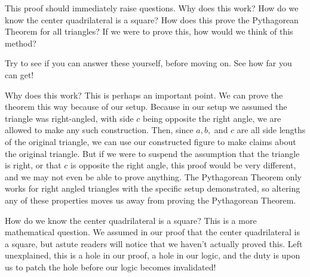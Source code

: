 This proof should immediately raise questions. Why does this work? How do we know the center quadrilateral is a square? How does this prove the Pythagorean Theorem for all triangles? If we were to prove this, how would we think of this method? 
\begin{exercise}
    Try to see if you can answer these yourself, before moving on. See how far you can get! 
\end{exercise}


Why does this work? This is perhaps an important point. We can prove the theorem this way because of our setup. Because in our setup we assumed the triangle was right-angled, with side $c$ being opposite the right angle, we are allowed to make any such construction. Then, since $a, b,$ and $c$ are all side lengths of the original triangle, we can use our constructed figure to make claims about the original triangle. But if we were to suspend the assumption that the triangle is right, or that $c$ is opposite the right angle, this proof would be very different, and we may not even be able to prove anything. The Pythagorean Theorem only works for right angled triangles with the specific setup demonstrated, so altering any of these properties moves us away from proving the Pythagorean Theorem.

How do we know the center quadrilateral is a square? This is a more mathematical question. We assumed in our proof that the center quadrilateral is a square, but astute readers will notice that we haven't actually proved this. Left unexplained, this is a hole in our proof, a hole in our logic, and the duty is upon us to patch the hole before our logic becomes invalidated!

